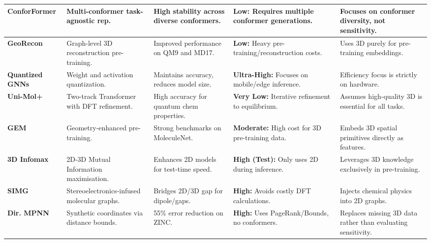 \documentclass[pdflatex,sn-vancouver-num]{sn-jnl}%
\theoremstyle{thmstyleone}%
\theoremstyle{thmstyletwo}%
\theoremstyle{thmstylethree}%
\renewenvironment{table}[1][htbp]%
{\begin{tableorg}[#1]%
\begin{center}
\begin{adjustbox}{max width=\linewidth}
\begin{threeparttable}
\tablebodyfont%
\renewcommand\footnotetext[2][]{{\removelastskip\vskip3pt%
\let\tablebodyfont\tablefootnotefont%
\hskip0pt\if!##1!\else{\smash{$^{##1}$}}\fi##2\par}}%
}{\end{threeparttable}\end{adjustbox}\end{center}\end{tableorg}}
\begin{document}
\begin{table}[htbp]
\begin{tabular}{|p{}|p{}|p{}|p{}|p{}|}
    \textbf{ConforFormer} \cite{klein2026conforformer} & Multi-conformer task-agnostic rep. & High stability across diverse conformers. & \textbf{Low:} Requires multiple conformer generations. & Focuses on conformer diversity, not sensitivity. \\
    \hline
    
    \textbf{GeoRecon} \cite{yan2025georecongraphlevelrepresentationlearning} & Graph-level 3D reconstruction pre-training. & Improved performance on QM9 and MD17. & \textbf{Low:} Heavy pre-training/reconstruction costs. & Uses 3D purely for pre-training embeddings. \\
    \hline
    
    \textbf{Quantized GNNs} \cite{rasool2025quantized} & Weight and activation quantization. & Maintains accuracy, reduces model size. & \textbf{Ultra-High:} Focuses on mobile/edge inference. & Efficiency focus is strictly on hardware. \\
    \hline
    
    \textbf{Uni-Mol+} \cite{lu2024unimolplus} & Two-track Transformer with DFT refinement. & High accuracy for quantum chem properties. & \textbf{Very Low:} Iterative refinement to equilibrium. & Assumes high-quality 3D is essential for all tasks. \\
    \hline
    
    \textbf{GEM} \cite{fang2022gem} & Geometry-enhanced pre-training. & Strong benchmarks on MoleculeNet. & \textbf{Moderate:} High cost for 3D pre-training data. & Embeds 3D spatial primitives directly as features. \\
    \hline
    
    \textbf{3D Infomax} \cite{stark2022infomax} & 2D-3D Mutual Information maximisation. & Enhances 2D models for test-time speed. & \textbf{High (Test):} Only uses 2D during inference. & Leverages 3D knowledge exclusively in pre-training. \\
    \hline
    
    \textbf{SIMG} \cite{Boiko_2025} & Stereoelectronics-infused molecular graphs. & Bridges 2D/3D gap for dipole/gaps. & \textbf{High:} Avoids costly DFT calculations. & Injects chemical physics into 2D graphs. \\
    \hline
    
    \textbf{Dir. MPNN} \cite{gasteiger2021synthetic} & Synthetic coordinates via distance bounds. & 55\% error reduction on ZINC. & \textbf{High:} Uses PageRank/Bounds, no conformers. & Replaces missing 3D data rather than evaluating sensitivity. \\
    

\end{tabular}
\end{table}
\end{document}
